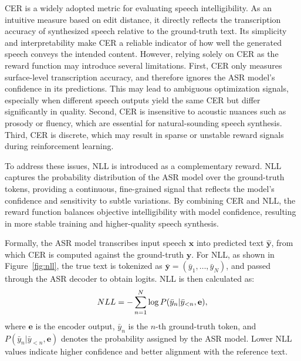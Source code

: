 \documentclass{article}
\begin{document}
CER is a widely adopted metric for evaluating speech intelligibility. As an intuitive measure based on edit distance, it directly reflects the transcription accuracy of synthesized speech relative to the ground-truth text. Its simplicity and interpretability make CER a reliable indicator of how well the generated speech conveys the intended content.
However, relying solely on CER as the reward function may introduce several limitations. First, CER only measures surface-level transcription accuracy, and therefore ignores the ASR model’s confidence in its predictions. This may lead to ambiguous optimization signals, especially when different speech outputs yield the same CER but differ significantly in quality. Second, CER is insensitive to acoustic nuances such as prosody or fluency, which are essential for natural-sounding speech synthesis. Third, CER is discrete, which may result in sparse or unstable reward signals during reinforcement learning. 

To address these issues, NLL is introduced as a complementary reward. NLL captures the probability distribution of the ASR model over the ground-truth tokens, providing a continuous, fine-grained signal that reflects the model’s confidence and sensitivity to subtle variations. By combining CER and NLL, the reward function balances objective intelligibility with model confidence, resulting in more stable training and higher-quality speech synthesis.


Formally, the ASR model transcribes input speech $\mathbf{x}$ into predicted text $\mathbf{\hat{y}}$, from which CER is computed against the ground-truth $\mathbf{y}$. For NLL, as shown in Figure~\ref{fig:nll}, the true text is tokenized as $\mathbf{\bar{y}} = (\bar{y}_1, \dots, \bar{y}_N)$, and passed through the ASR decoder to obtain logits. NLL is then calculated as:
\begin{equation}
\setlength\abovedisplayskip{3pt}
\setlength\belowdisplayskip{3pt}
NLL = - \sum_{n=1}^{N} \log P(\bar{y}_n | \bar{y}_{<n}, \mathbf{e}),
\end{equation}
where $\mathbf{e}$ is the encoder output, $\bar{y}_n$ is the $n$-th ground-truth token, and $P(\bar{y}_n | \bar{y}_{<n}, \mathbf{e})$ denotes the probability assigned by the ASR model. Lower NLL values indicate higher confidence and better alignment with the reference text.
\end{document}
